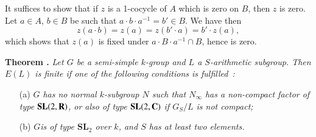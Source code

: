 It suffices to show that if $z$ is a 1-cocycle of $A$ which is zero on $B$, then $z$ is zero. Let $a\in A$, $b\in B$ be such that $a\cdot b\cdot a^{-1}=b'\in B$. We have then
$$
z(a\cdot b)=z(a)=z(b'\cdot a)=b'\cdot z(a),
$$
which shows that $z(a)$ is fixed under $a\cdot B\cdot a^{-1}\cap B$, hence is zero.

\medskip
\noindent
{\bf Theorem .\label{art04-thm3.6}}
{\em Let $G$ be a semi-simple $k$-group and $L$ a $S$-arithmetic subgroup. Then $E(L)$ is finite if one of the following conditions is fulfilled~:}
\begin{itemize}
\item[{\rm(a)}] {\em $G$ has no normal $k$-subgroup $N$ such that $N_{\infty}$ has a non-compact factor of type $\mathbf{SL}(2,\mathbf{R})$, or also of type $\mathbf{SL}(2,\mathbf{C})$ if $G_{S}/L$ is not compact;}

\item[{\rm(b)}] {\em $G$\pageoriginale is of type $\mathbf{SL}_{2}$ over $k$, and $S$ has at least two elements.}
\end{itemize}

